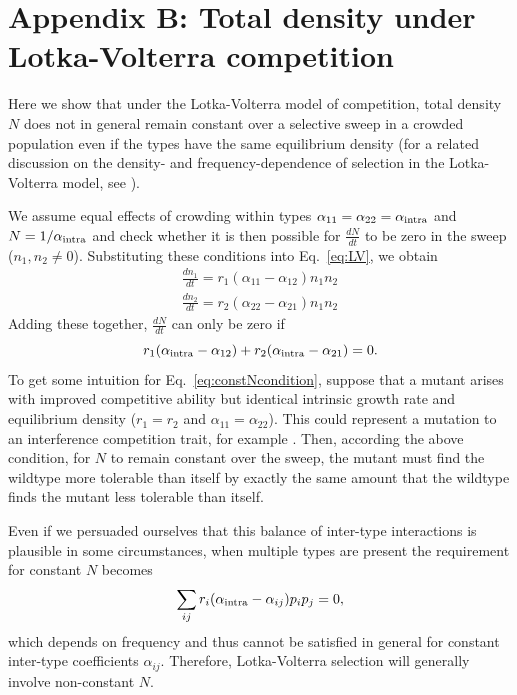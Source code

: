 \documentclass[12pt]{article}
\begin{document}
\section*{Appendix B: Total density under Lotka-Volterra competition}

Here we show that under the Lotka-Volterra model of competition, total density $N$ does not in general remain constant over a selective sweep in a crowded population even if the types have the same equilibrium density (for a related discussion on the density- and frequency-dependence of selection in the Lotka-Volterra model, see \citep{smouse_1976,mallet_2012}).

We assume equal effects of crowding within types $\alpha_{11}=\alpha_{22}=\alpha_{\rm intra}$ and $N=1/\alpha_{\rm intra}$ and check whether it is then possible for $\frac{dN}{dt}$ to be zero in the sweep ($n_1,n_2 \neq 0$). Substituting these conditions into Eq.~\eqref{eq:LV}, we obtain 
\begin{align}
\frac{d n_1}{dt} = r_1(\alpha_{11}-\alpha_{12})n_1n_2 \nonumber\\
\frac{d n_2}{dt} = r_2(\alpha_{22}-\alpha_{21})n_1n_2
\end{align}
Adding these together, $\frac{dN}{dt}$ can only be zero if 
\begin{equation}
r_1(\alpha_{\rm intra}-\alpha_{12})+r_2(\alpha_{\rm intra}-\alpha_{21})=0. \label{eq:constNcondition}
\end{equation}
To get some intuition for Eq.~\eqref{eq:constNcondition}, suppose that a mutant arises with improved competitive ability but identical intrinsic growth rate and equilibrium density ($r_1=r_2$ and $\alpha_{11}=\alpha_{22}$). This could represent a mutation to an interference competition trait, for example \citep{gill_1974}. Then, according the above condition, for $N$ to remain constant over the sweep, the mutant must find the wildtype more tolerable than itself by exactly the same amount that the wildtype finds the mutant less tolerable than itself. 

Even if we persuaded ourselves that this balance of inter-type interactions is plausible in some circumstances, when multiple types are present the requirement for constant $N$ becomes
\begin{equation}
\sum_{ij}r_i(\alpha_{\rm intra}-\alpha_{ij})p_ip_j=0,
\end{equation}
which depends on frequency and thus cannot be satisfied in general for constant inter-type coefficients $\alpha_{ij}$. Therefore, Lotka-Volterra selection will generally involve non-constant $N$.
\end{document}
